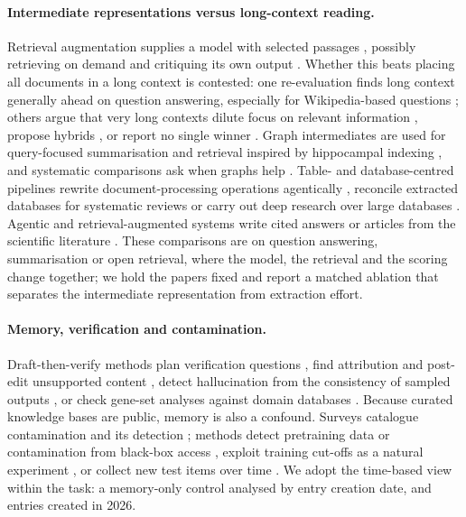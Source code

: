 \documentclass{article} %
\begin{document}
\paragraph{Intermediate representations versus long-context reading.}
Retrieval augmentation supplies a model with selected passages \citep{Lewis2020RetrievalaugmentedGeneration}, possibly retrieving on demand and critiquing its own output \citep{Asai2023SelfragLearning}. Whether this beats placing all documents in a long context is contested: one re-evaluation finds long context generally ahead on question answering, especially for Wikipedia-based questions \citep{Li2024LongContext}; others argue that very long contexts dilute focus on relevant information \citep{Yu2024DefenseRag}, propose hybrids \citep{li2024retrieval}, or report no single winner \citep{Li2025LaraBenchmarking}. Graph intermediates are used for query-focused summarisation \citep{edge2024local} and retrieval inspired by hippocampal indexing \citep{Gutirrez2024HipporagNeurobiologically}, and systematic comparisons ask when graphs help \citep{han2025rag,xiang2025use}. Table- and database-centred pipelines rewrite document-processing operations agentically \citep{shankar2025docetl}, reconcile extracted databases for systematic reviews \citep{joshi2026sliders} or carry out deep research over large databases \citep{liu2026datastorm}. Agentic and retrieval-augmented systems write cited answers or articles from the scientific literature \citep{Lla2023PaperqaRetrievalaugmented,Asai2024OpenscholarSynthesizing,shao2024assisting,singh2025ai2,skarlinski2024language}. These comparisons are on question answering, summarisation or open retrieval, where the model, the retrieval and the scoring change together; we hold the papers fixed and report a matched ablation that separates the intermediate representation from extraction effort.

\paragraph{Memory, verification and contamination.}
Draft-then-verify methods plan verification questions \citep{dhuliawala2024chainofverification}, find attribution and post-edit unsupported content \citep{Gao2022RarrResearching}, detect hallucination from the consistency of sampled outputs \citep{Manakul2023SelfcheckgptZeroresource}, or check gene-set analyses against domain databases \citep{wang2025geneagent}. Because curated knowledge bases are public, memory is also a confound. Surveys catalogue contamination and its detection \citep{Xu2024BenchmarkData,Deng2024UnveilingSpectrum,Ravaut2024ComprehensiveSurvey,Cheng2025SurveyData,Chen2025RecentAdvances}; methods detect pretraining data or contamination from black-box access \citep{Shi2023DetectingPretraining,oren2024proving,golchin2024time,Golchin2025DataContamination}, exploit training cut-offs as a natural experiment \citep{Roberts2023DataContamination}, or collect new test items over time \citep{Jain2024LivecodebenchHolistic,White2024LivebenchChallenging}. We adopt the time-based view within the task: a memory-only control analysed by entry creation date, and entries created in 2026.
\end{document}
